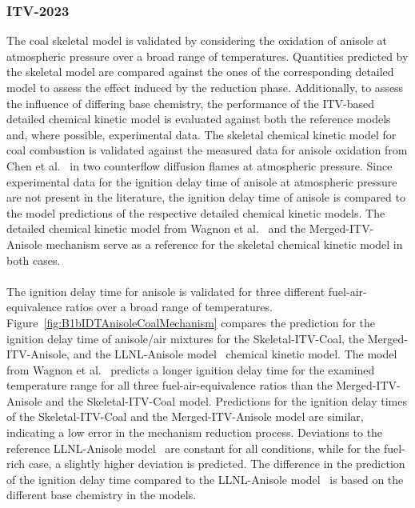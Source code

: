 \begin{refsection}
\subsubsection{ITV-2023}
The coal skeletal model is validated by considering the oxidation of anisole at atmospheric pressure over a broad range of temperatures. Quantities predicted by the skeletal model are compared against the ones of the corresponding detailed model to assess the effect induced by the reduction phase. Additionally, to assess the influence of differing base chemistry, the performance of the ITV-based detailed chemical kinetic model is evaluated against both the reference models and, where possible, experimental data. The skeletal chemical kinetic model for coal combustion is validated against the measured data for anisole oxidation from Chen et al.~\cite{Chen2022} in two counterflow diffusion flames at atmospheric pressure. Since experimental data for the ignition delay time of anisole at atmospheric pressure are not present in the literature, the ignition delay time of anisole is compared to the model predictions of the respective detailed chemical kinetic models. The detailed chemical kinetic model from Wagnon et al.~\cite{Wagnon2018} and the Merged-ITV-Anisole mechanism serve as a reference for the skeletal chemical kinetic model in both cases.
\\\\
The ignition delay time for anisole is validated for three different fuel-air-equivalence ratios over a broad range of temperatures. Figure~\ref{fig:B1bIDTAnisoleCoalMechanism} compares the prediction for the ignition delay time of anisole/air mixtures for the Skeletal-ITV-Coal, the Merged-ITV-Anisole, and the LLNL-Anisole model~\cite{Wagnon2018} chemical kinetic model. The model from Wagnon et al.~\cite{Wagnon2018} predicts a longer ignition delay time for the examined temperature range for all three fuel-air-equivalence ratios than the Merged-ITV-Anisole and the Skeletal-ITV-Coal model. Predictions for the ignition delay times of the Skeletal-ITV-Coal and the Merged-ITV-Anisole model are similar, indicating a low error in the mechanism reduction process. Deviations to the reference LLNL-Anisole model~\cite{Wagnon2018} are constant for all conditions, while for the fuel-rich case, a slightly higher deviation is predicted. The difference in the prediction of the ignition delay time compared to the LLNL-Anisole model~\cite{Wagnon2018} is based on the different base chemistry in the models.
\begin{figure}[h]

\end{figure}
\end{refsection}
